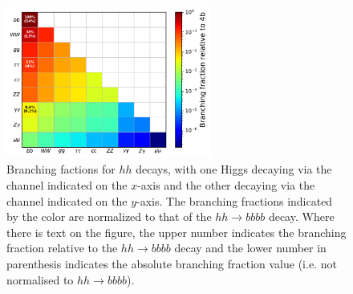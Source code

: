 \begin{figure}[!htb]
    \begin{center}
        \includegraphics[width=0.6\textwidth]{figures/search_hh/hh_br}
        \caption{
            Branching factions for $hh$ decays, with one Higgs decaying via the channel
            indicated on the $x$-axis and the other decaying via the channel indicated on the $y$-axis.
            The branching fractions indicated by the color are normalized to that of the $hh \rightarrow bbbb$
            decay.
            Where there is text on the figure, the upper number indicates the branching fraction
            relative to the $hh\rightarrow bbbb$ decay and the lower number in parenthesis indicates the absolute
            branching fraction value (i.e. not normalised to $hh \rightarrow bbbb$).
        }
        \label{fig:hh_br}
    \end{center}
\end{figure}

